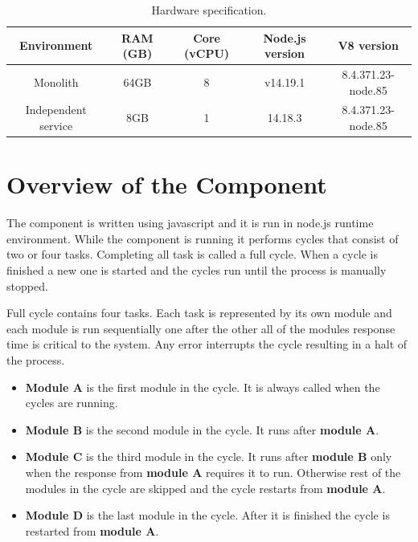 \begin{table}[h!]
    \begin{tabular}{|c|c|c|c|c|} 
        \hline
        Environment
        & RAM (GB)
        & Core (vCPU)
        & Node.js version
        & V8 version
        \\ 
        \hline
        Monolith
        & 64GB
        & 8
        & v14.19.1
        & 8.4.371.23-node.85
        \\
        \hline
        Independent service
        & 8GB
        & 1
        & 14.18.3
        & 8.4.371.23-node.85
        \\
        \hline
    \end{tabular}    
    \caption{Hardware specification.}
    \label{represented:harware:specs}
\end{table}

\section{Overview of the Component}
The component is written using javascript and it is run in node.js runtime environment.
While the component is running it performs cycles that consist of two or four tasks.
Completing all task is called a full cycle.
When a cycle is finished a new one is started and the cycles run until the process is manually stopped.

Full cycle contains four tasks.
Each task is represented by its own module and each module is run sequentially one after the other
all of the modules response time is critical to the system.
Any error interrupts the cycle resulting in a halt of the process.
\begin{itemize}
    \item
    \textbf{Module A} is the first module in the cycle.
    It is always called when the cycles are running.
    
    \item
    \textbf{Module B} is the second module in the cycle.
    It runs after \textbf{module A}.
    
    \item
    \textbf{Module C} is the third module in the cycle.
    It runs after \textbf{module B} only when the response from \textbf{module A} requires it to run.
    Otherwise rest of the modules in the cycle are skipped and the cycle restarts from \textbf{module A}.

    \item
    \textbf{Module D} is the last module in the cycle.
    After it is finished the cycle is restarted from \textbf{module A}.
\end{itemize}

